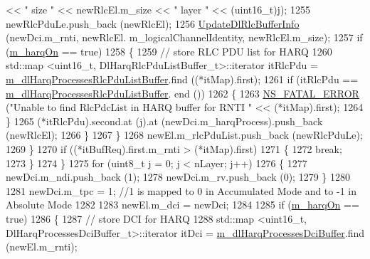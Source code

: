 \begin{DoxyCode}
      << \textcolor{stringliteral}{" size "} << newRlcEl.m\_size << \textcolor{stringliteral}{" layer "} << (uint16\_t)j);
1255                   newRlcPduLe.push\_back (newRlcEl);
1256                   \hyperlink{classns3_1_1TtaFfMacScheduler_a4c4e1638680640d8da95c4478ec3c06f}{UpdateDlRlcBufferInfo} (newDci.m\_rnti, newRlcEl.
      m\_logicalChannelIdentity, newRlcEl.m\_size);
1257                   \textcolor{keywordflow}{if} (\hyperlink{classns3_1_1TtaFfMacScheduler_a08875f91819cf2e7cf2ed3781d36cda1}{m\_harqOn} == \textcolor{keyword}{true})
1258                     \{
1259                       \textcolor{comment}{// store RLC PDU list for HARQ}
1260                       std::map <uint16\_t, DlHarqRlcPduListBuffer\_t>::iterator itRlcPdu =  
      \hyperlink{classns3_1_1TtaFfMacScheduler_a04e2e36b8114bfe977b8a3443822d7f1}{m\_dlHarqProcessesRlcPduListBuffer}.find ((*itMap).first);
1261                       \textcolor{keywordflow}{if} (itRlcPdu == \hyperlink{classns3_1_1TtaFfMacScheduler_a04e2e36b8114bfe977b8a3443822d7f1}{m\_dlHarqProcessesRlcPduListBuffer}.
      end ())
1262                         \{
1263                           \hyperlink{group__fatal_ga5131d5e3f75d7d4cbfd706ac456fdc85}{NS\_FATAL\_ERROR} (\textcolor{stringliteral}{"Unable to find RlcPdcList in HARQ buffer for RNTI 
      "} << (*itMap).first);
1264                         \}
1265                       (*itRlcPdu).second.at (j).at (newDci.m\_harqProcess).push\_back (newRlcEl);
1266                     \}
1267                 \}
1268               newEl.m\_rlcPduList.push\_back (newRlcPduLe);
1269             \}
1270           \textcolor{keywordflow}{if} ((*itBufReq).first.m\_rnti > (*itMap).first)
1271             \{
1272               \textcolor{keywordflow}{break};
1273             \}
1274         \}
1275       \textcolor{keywordflow}{for} (uint8\_t j = 0; j < nLayer; j++)
1276         \{
1277           newDci.m\_ndi.push\_back (1);
1278           newDci.m\_rv.push\_back (0);
1279         \}
1280 
1281       newDci.m\_tpc = 1; \textcolor{comment}{//1 is mapped to 0 in Accumulated Mode and to -1 in Absolute Mode}
1282 
1283       newEl.m\_dci = newDci;
1284 
1285       \textcolor{keywordflow}{if} (\hyperlink{classns3_1_1TtaFfMacScheduler_a08875f91819cf2e7cf2ed3781d36cda1}{m\_harqOn} == \textcolor{keyword}{true})
1286         \{
1287           \textcolor{comment}{// store DCI for HARQ}
1288           std::map <uint16\_t, DlHarqProcessesDciBuffer\_t>::iterator itDci = 
      \hyperlink{classns3_1_1TtaFfMacScheduler_aef07d22e5c2e6acf1f711736bce49fc8}{m\_dlHarqProcessesDciBuffer}.find (newEl.m\_rnti);

\end{DoxyCode}
